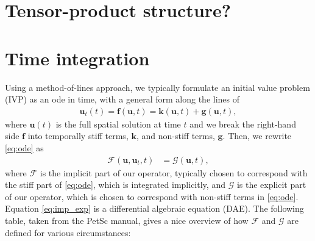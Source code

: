 \documentclass[a4paper,12pt]{article}
\begin{document}
\section{Tensor-product structure?}


\newpage
\section{Time integration}

Using a method-of-lines approach, we typically formulate an initial value problem (IVP) as an ode in time,
with a general form along the lines of
\begin{align}
\mathbf{u}_t(t) = \mathbf{f}(\mathbf{u}, t) = \mathbf{k}(\mathbf{u},t) + \mathbf{g}(\mathbf{u},t), \label{eq:ode}
\end{align}
where $\mathbf{u}(t)$ is the full spatial solution at time $t$ and we break the right-hand side $\mathbf{f}$ into
temporally stiff terms, $\mathbf{k}$, and non-stiff terms, $\mathbf{g}$. Then, we rewrite \eqref{eq:ode} as
\begin{align}
\mathcal{F}(\mathbf{u},\mathbf{u}_t,t) & = \mathcal{G}(\mathbf{u},t),\label{eq:imp_exp}
\end{align}
where $\mathcal{F}$ is the implicit part of our operator, typically chosen to correspond with the stiff part of \eqref{eq:ode},
which is integrated implicitly, and $\mathcal{G}$ is the explicit part of our operator, which is chosen to correspond with non-stiff
terms in \eqref{eq:ode}. Equation \eqref{eq:imp_exp} is a differential algebraic equation (DAE). The following table, taken from the
PetSc manual, gives a nice overview of how $\mathcal{F}$ and $\mathcal{G}$ are defined for various circumstances: 
\end{document}
